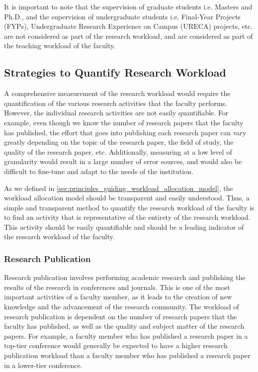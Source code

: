 It is important to note that the supervision of graduate students i.e. Masters and Ph.D., and the supervision of undergraduate students i.e. Final-Year Projects (FYPs), Undergraduate Research Experience on Campus (URECA) projects, etc. are not considered as part of the research workload, and are considered as part of the teaching workload of the faculty.

\subsection{Strategies to Quantify Research Workload}

A comprehensive measurement of the research workload would require the quantification of the various research activities that the faculty performs. However, the individual research activities are not easily quantifiable. For example, even though we know the number of research papers that the faculty has published, the effort that goes into publishing each research paper can vary greatly depending on the topic of the research paper, the field of study, the quality of the research paper, etc. Additionally, measuring at a low level of granularity would result in a large number of error sources, and would also be difficult to fine-tune and adapt to the needs of the institution.

As we defined in \autoref{sec:principles_guiding_workload_allocation_model}, the workload allocation model should be transparent and easily understood. Thus, a simple and transparent method to quantify the research workload of the faculty is to find an activity that is representative of the entirety of the research workload. This activity should be easily quantifiable and should be a leading indicator of the research workload of the faculty.


\subsubsection{Research Publication}

Research publication involves performing academic research and publishing the results of the research in conferences and journals. This is one of the most important activities of a faculty member, as it leads to the creation of new knowledge and the advancement of the research community. The workload of research publication is dependent on the number of research papers that the faculty has published, as well as the quality and subject matter of the research papers. For example, a faculty member who has published a research paper in a top-tier conference would generally be expected to have a higher research publication workload than a faculty member who has published a research paper in a lower-tier conference.


